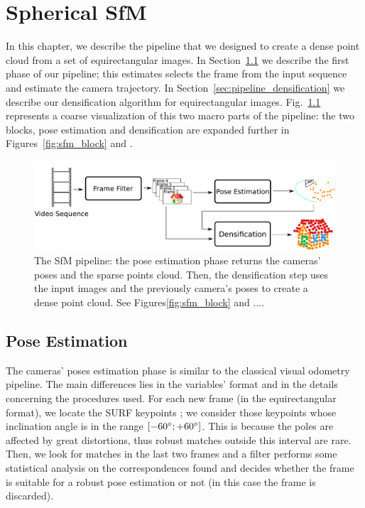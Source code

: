 \chapter{Spherical SfM}
In this chapter, we describe the pipeline that we designed to create a dense 
point cloud from a set of equirectangular images.
In Section~\ref{sec:pipeline_pose_estimation} we describe the first phase of our
pipeline; this estimates selects the frame from the input sequence and estimate
the camera trajectory. In Section~\ref{sec:pipeline_densification} we describe 
our densification algorithm for equirectangular images.
Fig.~\ref{fig:pipeline_overview}
represents a coarse visualization of this two macro parts of the 
pipeline: the two blocks, pose estimation and densification are 
expanded further in Figures~\ref{fig:sfm_block} and .

\begin{figure}
    \centering
    \includegraphics[width=0.8\linewidth]{img/pipeline_overview.pdf}
    \caption{The SfM pipeline: the pose estimation phase returns the cameras' 
    poses and the sparse points cloud. Then, the densification step uses 
    the input images and the previously camera's poses to create a dense
    point cloud. See Figures\ref{fig:sfm_block} and ....}
	\label{fig:pipeline_overview}
\end{figure}

\section{Pose Estimation}
\label{sec:pipeline_pose_estimation}
The cameras' poses estimation phase is similar to the classical visual 
odometry pipeline. The main differences lies in the variables' format and in 
the details concerning the procedures used.
For each new frame (in the equirectangular format), we locate the
SURF keypoints \cite{bay2006surf}; we consider those keypoints whose inclination angle is in the range $[-60\degree; +60\degree]$. This is because the poles are affected by great 
distortions, thus robust matches outside this interval are rare.
Then, we look for matches in the last two frames and a filter performs some 
statistical analysis on the correspondences found and decides whether the frame 
is suitable for a robust pose estimation or not (in this case the frame is 
discarded).

